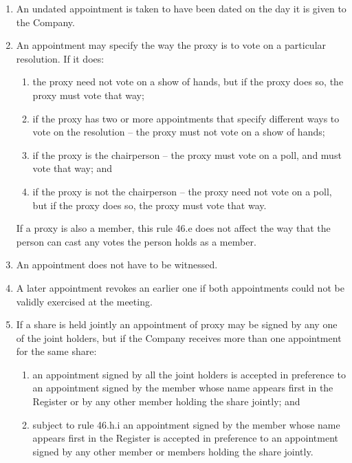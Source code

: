 \begin{enumerate}[label=(\alph*)]
    \item An undated appointment is taken to have been dated on the day it is given to the Company.
    
    \item An appointment may specify the way the proxy is to vote on a particular resolution. If it does:
    \begin{enumerate}[label=(\roman*)]
        \item the proxy need not vote on a show of hands, but if the proxy does so, the proxy must vote that way;
        \item if the proxy has two or more appointments that specify different ways to vote on the resolution – the proxy must not vote on a show of hands;
        \item if the proxy is the chairperson – the proxy must vote on a poll, and must vote that way; and
        \item if the proxy is not the chairperson – the proxy need not vote on a poll, but if the proxy does so, the proxy must vote that way.
    \end{enumerate}
    
    If a proxy is also a member, this rule 46.e does not affect the way that the person can cast any votes the person holds as a member.
    
    \item An appointment does not have to be witnessed.
    
    \item A later appointment revokes an earlier one if both appointments could not be validly exercised at the meeting.
    
    \item If a share is held jointly an appointment of proxy may be signed by any one of the joint holders, but if the Company receives more than one appointment for the same share:
    \begin{enumerate}[label=(\roman*)]
        \item an appointment signed by all the joint holders is accepted in preference to an appointment signed by the member whose name appears first in the Register or by any other member holding the share jointly; and
        \item subject to rule 46.h.i an appointment signed by the member whose name appears first in the Register is accepted in preference to an appointment signed by any other member or members holding the share jointly.
    \end{enumerate}
\end{enumerate} 